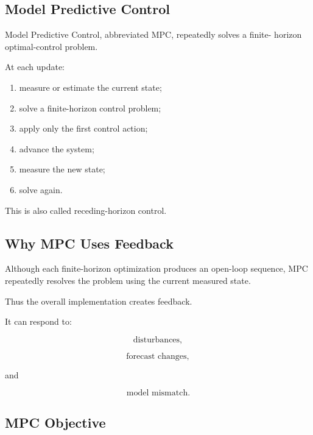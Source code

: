 \subsection{Model Predictive Control}
\label{subsec:model-predictive-control}

Model Predictive Control, abbreviated MPC, repeatedly solves a finite-
horizon optimal-control problem.

At each update:

\begin{enumerate}
    \item measure or estimate the current state;
    \item solve a finite-horizon control problem;
    \item apply only the first control action;
    \item advance the system;
    \item measure the new state;
    \item solve again.
\end{enumerate}

This is also called receding-horizon control.

\subsection{Why MPC Uses Feedback}
\label{subsec:why-mpc-feedback}

Although each finite-horizon optimization produces an open-loop sequence,
MPC repeatedly resolves the problem using the current measured state.

Thus the overall implementation creates feedback.

It can respond to:

\[
\boxed{
\text{disturbances},
}
\]

\[
\boxed{
\text{forecast changes},
}
\]

and

\[
\boxed{
\text{model mismatch}.
}
\]

\subsection{MPC Objective}
\label{subsec:mpc-objective}

